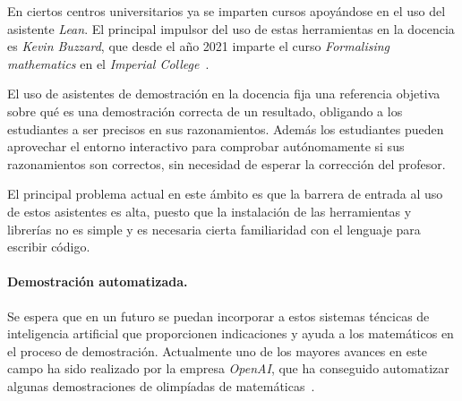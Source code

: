 En ciertos centros universitarios ya se imparten cursos apoyándose en el uso del
asistente \textit{Lean}. El principal impulsor del uso de estas herramientas en
la docencia es \textit{Kevin Buzzard}, que desde el año 2021 imparte el curso
\textit{Formalising mathematics} en el \textit{Imperial
	College}~\cite{buzzardFormalisingMathematicsFormalising}.

El uso de asistentes de demostración en la docencia fija una referencia objetiva
sobre qué es una demostración correcta de un resultado, obligando a los
estudiantes a ser precisos en sus razonamientos. Además los estudiantes pueden
aprovechar el entorno interactivo para comprobar autónomamente si sus
razonamientos son correctos, sin necesidad de esperar la corrección del
profesor.

El principal problema actual en este ámbito es que la barrera de entrada al uso
de estos asistentes es alta, puesto que la instalación de las herramientas y
librerías no es simple y es necesaria cierta familiaridad con el lenguaje para
escribir código.



\paragraph{Demostración automatizada.} Se espera que en un
futuro se puedan incorporar a estos sistemas téncicas de inteligencia artificial
que proporcionen indicaciones y ayuda a los matemáticos en el proceso de
demostración. Actualmente uno de los mayores avances en este campo ha sido
realizado por la empresa \textit{OpenAI}, que ha conseguido automatizar algunas
demostraciones de olimpíadas de matemáticas~\cite{poluSolvingFormalMath}.



